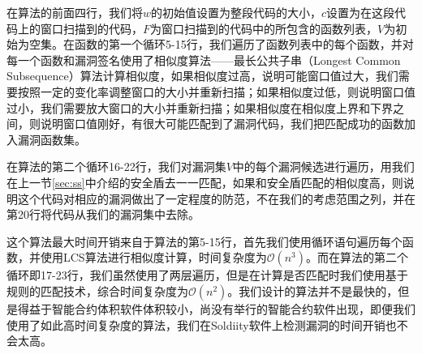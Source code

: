 在算法的前面四行，我们将$w$的初始值设置为整段代码的大小，$c$设置为在这段代码上的窗口扫描到的代码，$F$为窗口扫描到的代码中的所包含的函数列表，$V$为初始为空集。在函数的第一个循环5-15行，我们遍历了函数列表中的每个函数，并对每一个函数和漏洞签名使用了相似度算法——最长公共子串（Longest Common Subsequence）算法计算相似度，如果相似度过高，说明可能窗口值过大，我们需要按照一定的变化率调整窗口的大小并重新扫描；如果相似度过低，则说明窗口值过小，我们需要放大窗口的大小并重新扫描；如果相似度在相似度上界和下界之间，则说明窗口值刚好，有很大可能匹配到了漏洞代码，我们把匹配成功的函数加入漏洞函数集。

在算法的第二个循环16-22行，我们对漏洞集$V$中的每个漏洞候选进行遍历，用我们在上一节\ref{sec:ss}中介绍的安全盾去一一匹配，如果和安全盾匹配的相似度高，则说明这个代码对相应的漏洞做出了一定程度的防范，不在我们的考虑范围之列，并在第20行将代码从我们的漏洞集中去除。

这个算法最大时间开销来自于算法的第5-15行，首先我们使用循环语句遍历每个函数，并使用LCS算法进行相似度计算，时间复杂度为$\mathcal{O}(n^{3})$。而在算法的第二个循环即17-23行，我们虽然使用了两层遍历，但是在计算是否匹配时我们使用基于规则的匹配技术，综合时间复杂度为$\mathcal{O}(n^{2})$。我们设计的算法并不是最快的，但是得益于智能合约体积软件体积较小，尚没有举行的智能合约软件出现，即便我们使用了如此高时间复杂度的算法，我们在Soldiity软件上检测漏洞的时间开销也不会太高。
